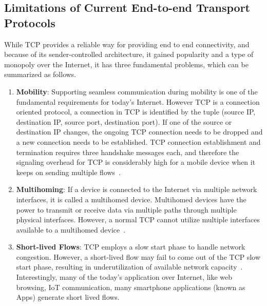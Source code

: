 \subsection{Limitations of Current End-to-end Transport Protocols}
While TCP provides a reliable way for providing end to end connectivity, and because of its sender-controlled architecture, it gained popularity and a type of monopoly over the Internet, it has three fundamental problems, which can be summarized as follows.  
\begin{enumerate}
	\item  \textbf{Mobility}: Supporting seamless communication during mobility is one of the fundamental requirements for today's Internet. However TCP is a connection oriented protocol, a connection in TCP is identified by the tuple (source IP, destination IP, source port, destination port). If one of the source or destination IP changes, the ongoing TCP connection needs to be dropped and a new connection needs to be established. TCP connection establishment and termination requires three handshake messages each, and therefore the signaling overhead for TCP is considerably high for a mobile device when it keeps on sending multiple flows~\cite{Yadav2016}. 
	\item \textbf{Multihoming}: If a device is connected to the Internet via multiple network interfaces, it is called a multihomed device. Multihomed devices have the power to transmit or receive data via multiple paths through multiple physical interfaces. However, a normal TCP cannot utilize multiple interfaces available to a multihomed device~\cite{abdrabou2016experimental,de2016observing}. 
	\item \textbf{Short-lived Flows}: TCP employs a slow start phase to handle network congestion. However, a short-lived flow may fail to come out of the TCP slow start phase, resulting in underutilization of available network capacity~\cite{de2016throughput,islam2016start}. Interestingly, many of the today's application over Internet, like web browsing, IoT communication, many smartphone applications (known as Apps) generate short lived flows. 
\end{enumerate}

